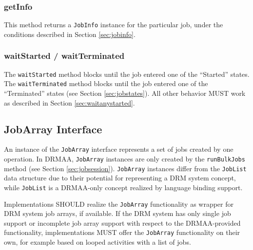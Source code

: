 \documentclass{article}
\newcommand{\h}[1]{\lstinline|#1|}
\newcommand{\rat}[1]{}
\begin{document}
\rat{
The getState() function now also returns job subState information. This is intended as additional information for the given DRMAA job state, and can be used for expressing the hold state differentiation from DRMAA 1.0 (conf. call Mar 31st 2009).
}

\subsubsection{getInfo}

This method returns a \h{JobInfo} instance for the particular job, under the conditions described in Section \ref{sec:jobinfo}. 

\subsubsection{waitStarted / waitTerminated}

The \h{waitStarted} method blocks until the job entered one of the \enquote{Started} states. The \h{waitTerminated} method blocks until the job entered one of the \enquote{Terminated} states (see Section \ref{sec:jobstates}). All other behavior MUST work as described in Section \ref{sec:waitanystarted}.

\subsection{JobArray Interface}
\label{sec:jobarray}

 An instance of the \h{JobArray} interface represents a set of jobs created by one operation. In DRMAA, \h{JobArray} instances are only created by the \h{runBulkJobs} method (see Section \ref{sec:jobsession}). \h{JobArray} instances differ from the \h{JobList} data structure due to their potential for representing a DRM system concept, while \h{JobList} is a DRMAA-only concept realized by language binding support.

Implementations SHOULD realize the \h{JobArray} functionality as wrapper for DRM system job arrays, if available. If the DRM system has only single job support or incomplete job array support with respect to the DRMAA-provided functionality, implementations MUST offer the \h{JobArray} functionality on their own, for example based on looped activities with a list of jobs.



\rat{
We are aware of the fact that some systems (e.g., LSF at the time of writing) do not support all DRMAA control methods offered for job arrays. Since we intended to avoid optional DRMAA methods wherever we could, the text here mandates the implementation to simulate the array support on its own. For example, looping over all jobs in the array and calling \enquote{suspend} for each one is trivial to implement and fulfills the same purpose.
}
\end{document}
